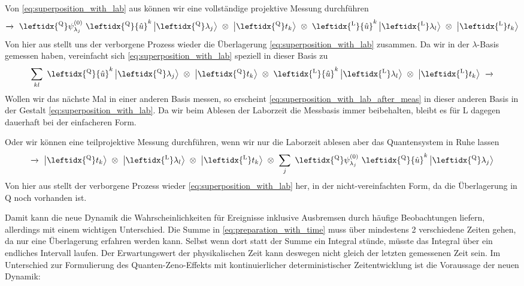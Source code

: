 \documentclass[12pt]{article}
\begin{document}
Von \eqref{eq:superposition_with_lab} aus können wir eine vollständige projektive Messung durchführen
\begin{equation}
\xrightarrow{}\ \leftidx{^\mathrm{Q}}\psi_{\lambda_j}^{(0)}\ 
\leftidx{^\mathrm{Q}}{\hat{u}}^k
\ket{\leftidx{^\mathrm{Q}}\lambda_j} 
\ \otimes\ \ket{\leftidx{^\mathrm{Q}}t_k}
\ \otimes\ \leftidx{^\mathrm{L}}{\hat{u}}^k \ket{ \leftidx{^\mathrm{L}}\lambda_l} 
\ \otimes\ \ket{\leftidx{^\mathrm{L}}t_k}
\end{equation}
Von hier aus stellt uns der verborgene Prozess wieder die Überlagerung \eqref{eq:superposition_with_lab} zusammen. Da wir in der $\lambda$-Basis gemessen haben, vereinfacht sich \eqref{eq:superposition_with_lab} speziell in dieser Basis zu 
\begin{equation}
\label{eq:superposition_with_lab_after_meas}
\sum_{kl}\ \leftidx{^\mathrm{Q}}{\hat{u}}^k
\ket{\leftidx{^\mathrm{Q}}\lambda_j} 
\ \otimes\ \ket{\leftidx{^\mathrm{Q}}t_k}
\ \otimes\ \leftidx{^\mathrm{L}}{\hat{u}}^k \ket{ \leftidx{^\mathrm{L}}\lambda_l} 
\ \otimes\ \ket{\leftidx{^\mathrm{L}}t_k}
\ \xrightarrow{}
\end{equation}
Wollen wir das nächste Mal in einer anderen Basis messen, so erscheint \eqref{eq:superposition_with_lab_after_meas} in dieser anderen Basis in der Gestalt \eqref{eq:superposition_with_lab}. Da wir beim Ablesen der Laborzeit die Messbasis immer beibehalten, bleibt es für L dagegen dauerhaft bei der einfacheren Form.

Oder wir können eine teilprojektive Messung durchführen, wenn wir nur die Laborzeit ablesen aber das Quantensystem in Ruhe lassen
\begin{equation}
\xrightarrow{}\ \ket{\leftidx{^\mathrm{Q}}t_k}
\ \otimes\ \ket{ \leftidx{^\mathrm{L}}\lambda_l} 
\ \otimes\ \ket{\leftidx{^\mathrm{L}}t_k}
\ \otimes\ \sum_{j}\ \leftidx{^\mathrm{Q}}\psi_{\lambda_j}^{(0)}\ 
\leftidx{^\mathrm{Q}}{\hat{u}}^k
\ket{\leftidx{^\mathrm{Q}}\lambda_j} 
\end{equation}
Von hier aus stellt der verborgene Prozess wieder \eqref{eq:superposition_with_lab} her, in der nicht-vereinfachten Form, da die Überlagerung in Q noch vorhanden ist.

Damit kann die neue Dynamik die Wahrscheinlichkeiten für Ereignisse inklusive Ausbremsen durch häufige Beobachtungen liefern, allerdings mit einem wichtigen Unterschied. Die Summe in \eqref{eq:preparation_with_time} muss über mindestens 2 verschiedene Zeiten gehen, da nur eine Überlagerung erfahren werden kann. Selbst wenn dort statt der Summe ein Integral stünde, müsste das Integral über ein endliches Intervall laufen. Der Erwartungswert der physikalischen Zeit kann deswegen nicht gleich der letzten gemessenen Zeit sein. Im Unterschied zur Formulierung des Quanten-Zeno-Effekts mit kontinuierlicher deterministischer Zeitentwicklung ist die Voraussage der neuen Dynamik: 
\end{document}

